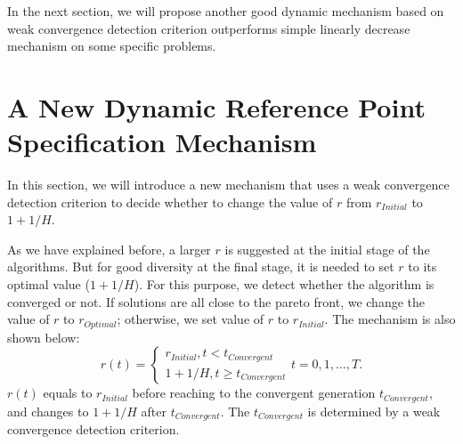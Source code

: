 \documentclass[conference]{IEEEtran}
\begin{document}
In the next section, we will propose another good dynamic mechanism based on weak convergence 
detection criterion outperforms simple linearly decrease mechanism on some specific problems.

% 
\section{A New Dynamic Reference Point Specification Mechanism}
In this section,
we will introduce a new mechanism that uses a weak convergence detection criterion to 
decide whether to change the value of $r$ from $r_{Initial}$ to $1+1/H$. 

As we have explained before, 
a larger $r$ is suggested at the initial stage of the algorithms. 
But for good diversity at the final stage,
it is needed to set $r$ to its optimal value ($1+1/H$). 
For this purpose, we detect whether the algorithm is converged or not.  
If solutions are all close to the pareto front, 
we change the value of $r$ to $r_{Optimal}$; otherwise, we set value of $r$ to 
$r_{Initial}$. The mechanism is also shown below:
\begin{equation}\label{endm1}
  r(t)=
  \begin{cases}
    r_{Initial}, t<t_{Convergent}\\
    1+1/H, t \ge t_{Convergent} 
  \end{cases}
  t=0,1,\dots,T.
\end{equation}
$r(t)$ equals to $r_{Initial}$ before reaching to the convergent generation $t_{Convergent}$, 
and changes to $1+1/H$ after $t_{Convergent}$. 
The $t_{Convergent}$ is determined by a weak convergence detection criterion. 
\end{document}
